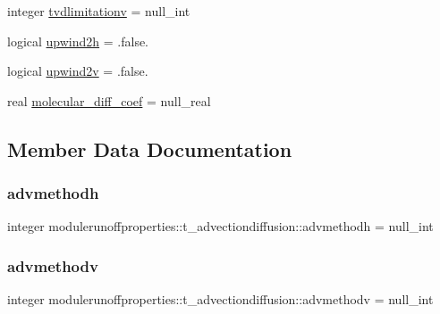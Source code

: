 \begin{DoxyCompactItemize}
integer \mbox{\hyperlink{structmodulerunoffproperties_1_1t__advectiondiffusion_a61bdd4e579e78785903f1a9c4f51cf75}{tvdlimitationv}} = null\+\_\+int
\item 
logical \mbox{\hyperlink{structmodulerunoffproperties_1_1t__advectiondiffusion_a44bc15c163f2a87d9418130db90ffd27}{upwind2h}} = .false.
\item 
logical \mbox{\hyperlink{structmodulerunoffproperties_1_1t__advectiondiffusion_ad6f30ce5715dbeae1891cd0e7a687212}{upwind2v}} = .false.
\item 
real \mbox{\hyperlink{structmodulerunoffproperties_1_1t__advectiondiffusion_a7f4e3f013a3c2202d7d3def5d4c5d61e}{molecular\+\_\+diff\+\_\+coef}} = null\+\_\+real
\end{DoxyCompactItemize}


\subsection{Member Data Documentation}
\mbox{\label{structmodulerunoffproperties_1_1t__advectiondiffusion_a12de3def8a10db7563f459e2b3c2a271}} 
\subsubsection{\texorpdfstring{advmethodh}{advmethodh}}
{\footnotesize\ttfamily integer modulerunoffproperties\+::t\+\_\+advectiondiffusion\+::advmethodh = null\+\_\+int\hspace{0.3cm}{\ttfamily [private]}}

\mbox{\label{structmodulerunoffproperties_1_1t__advectiondiffusion_a131e47fa7e890b1e96704caec5c8d84a}} 
\subsubsection{\texorpdfstring{advmethodv}{advmethodv}}
{\footnotesize\ttfamily integer modulerunoffproperties\+::t\+\_\+advectiondiffusion\+::advmethodv = null\+\_\+int\hspace{0.3cm}{\ttfamily [private]}}

